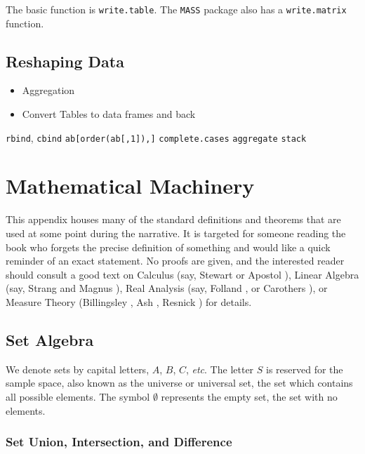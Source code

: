 \documentclass[captions=tableheading]{scrbook}
\begin{document}
The basic function is \texttt{write.table}. The \texttt{MASS} package also has a \texttt{write.matrix} function.
\section{Reshaping Data \label{sec:Reshaping-a-Data}}
\label{sec-20-6}

\begin{itemize}
\item Aggregation
\item Convert Tables to data frames and back
\end{itemize}

\texttt{rbind}, \texttt{cbind}
\texttt{ab[order(ab[,1]),]}
\texttt{complete.cases}
\texttt{aggregate}
\texttt{stack}
\chapter{Mathematical Machinery}
\label{sec-21}

\label{cha:Mathematical-Machinery}

This appendix houses many of the standard definitions and theorems that are used at some point during the narrative. It is targeted for someone reading the book who forgets the precise definition of something and would like a quick reminder of an exact statement. No proofs are given, and the interested reader should consult a good text on Calculus (say, Stewart \cite{Stewart2008} or Apostol \cite{Apostol1967,ApostolI1967}), Linear Algebra (say, Strang \cite{Strang1988} and Magnus \cite{Magnus1999}), Real Analysis (say, Folland \cite{Folland1999}, or Carothers \cite{Carothers2000}), or Measure Theory (Billingsley \cite{Billingsley1995}, Ash \cite{Ash2000}, Resnick \cite{Resnick1999}) for details. 
\section{Set Algebra \label{sec:The-Algebra-of}}
\label{sec-21-1}


We denote sets by capital letters, \(A\), \(B\), \(C\), \emph{etc}. The letter \(S\) is reserved for the sample space, also known as the universe or universal set, the set which contains all possible elements. The symbol \(\emptyset\) represents the empty set, the set with no elements. 
\subsection{Set Union, Intersection, and Difference}
\label{sec-21-1-1}
\end{document}
